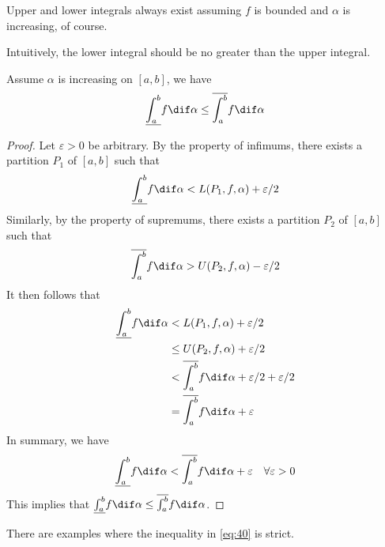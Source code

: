 \documentclass[thmcnt=section, color=blue, 12pt]{my-elegantbook}
\begin{document}
\begin{note}
	Upper and lower integrals always exist
	assuming $f$ is bounded and $\alpha$ is increasing, of course.
\end{note}

Intuitively, the lower integral should be no greater than the upper integral.

\begin{theorem}
	Assume $\alpha$ is increasing on $[a, b]$, we have
	\begin{align}
		\underline{\int_a^b} f \dif \alpha
		\leq \overline{\int_a^b} f \dif \alpha
		\label{eq:40}
	\end{align}
\end{theorem}

\begin{proof}
	Let $\varepsilon > 0$ be arbitrary.
	By the property of infimums, there exists a partition $P_1$ of $[a, b]$
	such that
	\begin{align*}
		\underline{\int_a^b} f \dif \alpha
		< L(P_1, f, \alpha) + \varepsilon/2
	\end{align*}
	Similarly, by the property of supremums,
	there exists a partition $P_2$ of $[a, b]$
	such that
	\begin{align*}
		\overline{\int_a^b} f \dif \alpha
		> U(P_2, f, \alpha) - \varepsilon/2
	\end{align*}
	It then follows that
	\begin{align*}
		\underline{\int_a^b} f \dif \alpha
		 & < L(P_1, f, \alpha) + \varepsilon/2                                 \\
		 & \leq U(P_2, f, \alpha) + \varepsilon/2                              \\
		 & < \overline{\int_a^b} f \dif \alpha + \varepsilon/2 + \varepsilon/2 \\
		 & = \overline{\int_a^b} f \dif \alpha + \varepsilon
	\end{align*}
	In summary, we have
	\begin{align*}
		\underline{\int_a^b} f \dif \alpha
		< \overline{\int_a^b} f \dif \alpha + \varepsilon
		\quad \forall \varepsilon > 0
	\end{align*}
	This implies that $\underline{\int_a^b} f \dif \alpha \leq \overline{\int_a^b} f \dif \alpha$.
\end{proof}

There are examples where the inequality in \eqref{eq:40} is strict.
\end{document}
